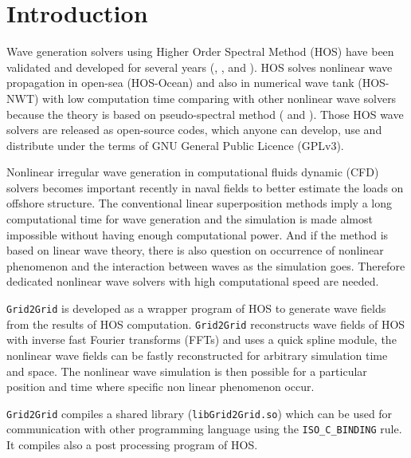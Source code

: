 \pagebreak
\section{Introduction}

Wave generation solvers using Higher Order Spectral Method (HOS) have been validated and developed for several years (\cite{ducrozet2016}, \cite{ducrozet2007}, \cite{bonnefoy2011} and \cite{ducrozet2012}). HOS solves nonlinear wave propagation in open-sea (HOS-Ocean) and also in numerical wave tank (HOS-NWT) with low computation time comparing with other nonlinear wave solvers because the theory is based on pseudo-spectral method (\cite{HOSOcean} and \cite{HOSNWT}). Those HOS wave solvers are released as open-source codes, which anyone can develop, use and distribute under the terms of GNU General Public Licence (GPLv3).

Nonlinear irregular wave generation in computational fluids dynamic (CFD) solvers becomes important recently in naval fields to better estimate the loads on offshore structure. The conventional linear superposition methods imply a long computational time for wave generation and the simulation is made almost impossible without having enough computational power. And if the method is based on linear wave theory, there is also question on occurrence of nonlinear phenomenon and the interaction between waves as the simulation goes. Therefore dedicated nonlinear wave solvers with high computational speed are needed.

\texttt{Grid2Grid} is developed as a wrapper program of HOS to generate wave fields from the results of HOS computation. \texttt{Grid2Grid} reconstructs wave fields of HOS with inverse fast Fourier transforms (FFTs) and uses a quick spline module, the nonlinear wave fields can be fastly reconstructed for arbitrary simulation time and space. The nonlinear wave simulation is then possible for a particular position and time where specific non linear phenomenon occur.

\texttt{Grid2Grid} compiles a shared library (\texttt{libGrid2Grid.so}) which can be used for communication with other programming language using the \texttt{ISO\_C\_BINDING} rule. It compiles also a post processing program of HOS. 


